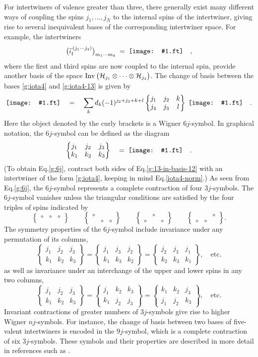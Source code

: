 \documentclass[graybox, secnum]{svmult}
\makeatletter
\newcommand{\ft}{pdf}        %
\newcommand{\makeSymbol}[1]{\mathord{\vcenter{\hbox{#1}}}}
\newcommand{\Symbol}[1]{\makeSymbol{\texttt{[image: \#1.\\ft]}}}
\newcommand{\Eq}[1]{Eq.\@\xspace\eqref{#1}}
\newcommand{\idx}[1]{#1}
\newcommand{\sixj}[6]{\begin{Bmatrix} #1&#2&#3 \\ #4&#5&#6 \end{Bmatrix}}
\makeatother
\begin{document}
For intertwiners of valence greater than three, there generally exist many different ways of coupling the spins $j_1, \dots, j_N$ to the internal spins of the intertwiner, giving rise to several inequivalent bases of the corresponding intertwiner space. For example, the intertwiners
\vspace{-8pt}
\begin{equation}
	\bigl(\widetilde\iota^{\,(j_1\cdots j_4)}_l\bigr)_{m_1\cdots m_4} \; = \; \Symbol{iota413} \quad ,
	\label{g:iota4-13}
\end{equation}
where the first and third spins are now coupled to the internal spin, provide another basis of the space ${\rm Inv}\,\bigl({\cal H}_{j_1}\otimes\cdots\otimes{\cal H}_{j_4}\bigr)$. The change of basis between the bases \eqref{g:iota4} and \eqref{g:iota4-13} is given by
\begin{equation}
	\Symbol{iota413} \quad = \quad \sum_k d_k(-1)^{j_2+j_3+k+l}\sixj{j_1}{j_2}{k}{j_4}{j_3}{l}\;\Symbol{iota412} \quad . 
	\label{g:13-in-basis-12}
\end{equation}
Here the object denoted by the curly brackets is a Wigner \idx{$6j$-symbol}. In graphical notation, the $6j$-symbol can be defined as the diagram
\begin{equation}
	\sixj{j_1}{j_2}{j_3}{k_1}{k_2}{k_3} \quad = \; \Symbol{6j} \quad .
	\label{g:6j}
\end{equation}
(To obtain \Eq{g:6j}, contract both sides of \Eq{g:13-in-basis-12} with an intertwiner of the form \eqref{g:iota4}, keeping in mind \Eq{iota4-norm}.) As seen from \Eq{g:6j}, the $6j$-symbol represents a complete contraction of four $3j$-symbols. The $6j$-symbol vanishes unless the triangular conditions are satisfied by the four triples of spins indicated by
\begin{equation}
	\sixj{\circ}{\circ}{\circ}{}{}{} \qquad \sixj{\circ}{}{}{}{\circ}{\circ} \qquad \sixj{}{\circ}{}{\circ}{}{\circ} \qquad \sixj{}{}{\circ}{\circ}{\circ}{}{}.
	\label{}
\end{equation}
The symmetry properties of the $6j$-symbol include invariance under any permutation of its columns,
\begin{equation}
	\sixj{j_1}{j_2}{j_3}{k_1}{k_2}{k_3} = \sixj{j_1}{j_3}{j_2}{k_1}{k_3}{k_2} = \sixj{j_2}{j_3}{j_1}{k_2}{k_3}{k_1}, \quad \text{etc.}
	\label{}
\end{equation}
as well as invariance under an interchange of the upper and lower spins in any two columns,
\begin{equation}
	\sixj{j_1}{j_2}{j_3}{k_1}{k_2}{k_3} = \sixj{j_1}{k_2}{k_3}{k_1}{j_2}{j_3} = \sixj{k_1}{k_2}{j_3}{j_1}{j_2}{k_3}, \quad \text{etc.}
	\label{}
\end{equation}
Invariant contractions of greater numbers of $3j$-symbols give rise to higher Wigner $nj$-symbols.  For instance, the change of basis between two bases of five-valent intertwiners is encoded in the $9j$-symbol, which is a complete contraction of six $3j$-symbols. These symbols and their properties are described in more detail in references such as \cite{brink1968angular, Varshalovich:1988ye, Yutsis:1962bk}.
\end{document}
